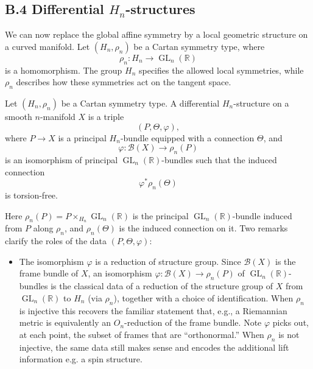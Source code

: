 \documentclass[a4paper,11pt]{article}
\begin{document}
\begin{appendices}
\subsection*{B.4 Differential $H_n$-structures}

We can now replace the global affine symmetry by a local geometric structure on a curved manifold. Let $(H_n,\rho_n)$ be a Cartan symmetry type, where
\[
\rho_n:H_n\longrightarrow\operatorname{GL}_n(\mathbb{R})
\]
is a homomorphism. The group $H_n$ specifies the allowed local symmetries, while $\rho_n$ describes how these symmetries act on the tangent space.

\begin{definition}
Let $(H_n,\rho_n)$ be a Cartan symmetry type. A differential
$H_n$-structure on a smooth $n$-manifold $X$ is a triple
\[
(P,\Theta,\varphi),
\]
where $P\to X$ is a principal $H_n$-bundle equipped with a connection
$\Theta$, and
\[
\varphi:\mathcal{B}(X)\longrightarrow \rho_n(P)
\]
is an isomorphism of principal $\operatorname{GL}_n(\mathbb{R})$-bundles such that the induced connection
\[
\varphi^*\rho_n(\Theta)
\]
is torsion-free.
\end{definition}

Here $\rho_n(P) = P\times_{H_n}\operatorname{GL}_n(\mathbb{R})$ is the principal $\operatorname{GL}_n(\mathbb{R})$-bundle induced from $P$ along
$\rho_n$, and $\rho_n(\Theta)$ is the induced connection on it. Two remarks
clarify the roles of the data $(P,\Theta,\varphi)$:

\begin{remark}
\begin{itemize}
\item The isomorphism $\varphi$ is a reduction of structure group. Since $\mathcal B(X)$ is the frame bundle of $X$, an isomorphism
$\varphi:\mathcal B(X)\to\rho_n(P)$ of $\operatorname{GL}_n(\mathbb{R})$-bundles is the classical data of a reduction of the structure group of $X$ from $\operatorname{GL}_n(\mathbb{R})$ to $H_n$ (via $\rho_n$), together with a choice of identification. When $\rho_n$ is injective this recovers the familiar statement that, e.g., a Riemannian metric is equivalently an $O_n$-reduction of the frame bundle. Note $\varphi$ picks out, at each point, the subset of frames
that are ``orthonormal.'' When $\rho_n$ is not injective, the same data still makes sense and encodes the additional lift information e.g. a spin structure.


\end{itemize}
\end{remark}
\end{appendices}
\end{document}
